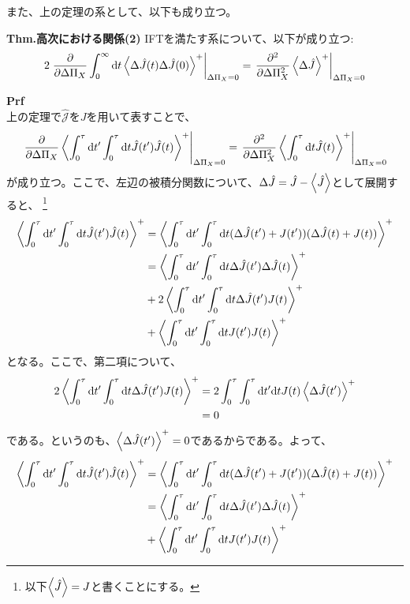 \documentclass[a4paper,11pt]{jsarticle}
\begin{document}
また、上の定理の系として、以下も成り立つ。
\begin{itembox}[l]{\textbf{Thm.高次における関係(2)}}
    IFTを満たす系について、以下が成り立つ:
    \begin{align}
        2\left.\pdv{\Delta \Pi_X} \int_0 ^{\infty} \dd t \ev{\Delta \hat{J}(t) \Delta \hat{J}(0)}^+\right|_{\Delta \Pi_X = 0} = \left.\pdv[2]{\Delta \Pi_X} \ev{\Delta \hat{J}}^+\right|_{\Delta \Pi_X = 0}
    \end{align}
\end{itembox}
\textbf{Prf}\\
上の定理で$\hat{\mathcal{J}}$を$J$を用いて表すことで、
\begin{align}
    \left.\pdv{\Delta \Pi_X} \ev{\int_0 ^{\tau} \dd t' \int_0 ^{\tau} \dd t \hat{J}(t')\hat{J}(t)}^+ \right|_{\Delta \Pi_X = 0} = \left.\pdv[2]{\Delta \Pi_X} \ev{\int_0 ^{\tau} \dd t \hat{J}(t)}^+\right|_{\Delta \Pi_X = 0}
\end{align}
が成り立つ。ここで、左辺の被積分関数について、$\Delta \hat{J} = \hat{J} - \ev{\hat{J}}$として展開すると、
\footnote{
    以下$\ev{\hat{J}} = J$と書くことにする。
}
\begin{align}
    \ev{\int_0 ^{\tau} \dd t' \int_0 ^{\tau} \dd t \hat{J}(t')\hat{J}(t)}^+ &= \ev{\int_0 ^{\tau} \dd t' \int_0 ^{\tau} \dd t (\Delta \hat{J}(t') +{J}(t'))(\Delta \hat{J}(t) +{J}(t))}^+\\
    &= \ev{\int_0 ^{\tau} \dd t' \int_0 ^{\tau} \dd t \Delta \hat{J}(t')\Delta \hat{J}(t)}^+ \\
    &+ 2\ev{\int_0 ^{\tau} \dd t' \int_0 ^{\tau} \dd t \Delta \hat{J}(t'){J}(t)}^+\\
    &+ \ev{\int_0 ^{\tau} \dd t' \int_0 ^{\tau} \dd t {J}(t') {J}(t)}^+
\end{align}
となる。ここで、第二項について、
\begin{align}
    2\ev{\int_0 ^{\tau} \dd t' \int_0 ^{\tau} \dd t \Delta \hat{J}(t') {J}(t)}^+ &= 2\int_0 ^{\tau} \int_0 ^{\tau} \dd t' \dd t J(t) \ev{\Delta \hat{J}(t')}^+\\
    &= 0
\end{align}
である。というのも、$\ev{\Delta \hat{J}(t')}^+ = 0$であるからである。よって、
\begin{align}
    \ev{\int_0 ^{\tau} \dd t' \int_0 ^{\tau} \dd t \hat{J}(t')\hat{J}(t)}^+ &= \ev{\int_0 ^{\tau} \dd t' \int_0 ^{\tau} \dd t (\Delta \hat{J}(t') +{J}(t'))(\Delta \hat{J}(t) +{J}(t))}^+\\
    &= \ev{\int_0 ^{\tau} \dd t' \int_0 ^{\tau} \dd t \Delta \hat{J}(t')\Delta \hat{J}(t)}^+ \\
    &+ \ev{\int_0 ^{\tau} \dd t' \int_0 ^{\tau} \dd t {J}(t'){J}(t)}^+
\end{align}
\end{document}
